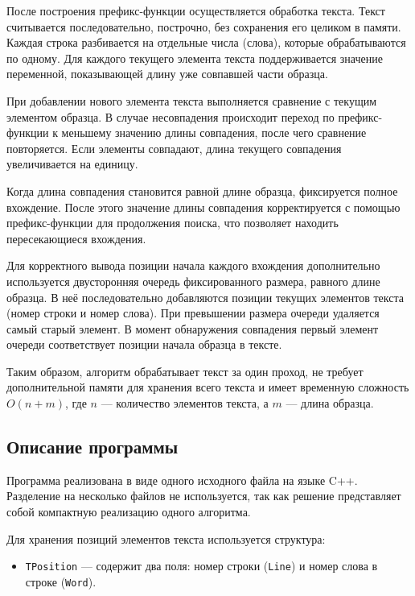 \documentclass[12pt]{article}
\begin{document}
После построения префикс-функции осуществляется обработка текста. Текст считывается последовательно, построчно, без сохранения его целиком в памяти. Каждая строка разбивается на отдельные числа (слова), которые обрабатываются по одному. Для каждого текущего элемента текста поддерживается значение переменной, показывающей длину уже совпавшей части образца.

При добавлении нового элемента текста выполняется сравнение с текущим элементом образца. В случае несовпадения происходит переход по префикс-функции к меньшему значению длины совпадения, после чего сравнение повторяется. Если элементы совпадают, длина текущего совпадения увеличивается на единицу.

Когда длина совпадения становится равной длине образца, фиксируется полное вхождение. После этого значение длины совпадения корректируется с помощью префикс-функции для продолжения поиска, что позволяет находить пересекающиеся вхождения.

Для корректного вывода позиции начала каждого вхождения дополнительно используется двусторонняя очередь фиксированного размера, равного длине образца. В неё последовательно добавляются позиции текущих элементов текста (номер строки и номер слова). При превышении размера очереди удаляется самый старый элемент. В момент обнаружения совпадения первый элемент очереди соответствует позиции начала образца в тексте.

Таким образом, алгоритм обрабатывает текст за один проход, не требует дополнительной памяти для хранения всего текста и имеет временную сложность $O(n + m)$, где $n$ — количество элементов текста, а $m$ — длина образца. 

\subsection*{Описание программы}

Программа реализована в виде одного исходного файла на языке C++. Разделение на несколько файлов не используется, так как решение представляет собой компактную реализацию одного алгоритма.

Для хранения позиций элементов текста используется структура:
\begin{itemize}
	\item \texttt{TPosition} — содержит два поля: номер строки (\texttt{Line}) и номер слова в строке (\texttt{Word}).
\end{itemize}
\end{document}
